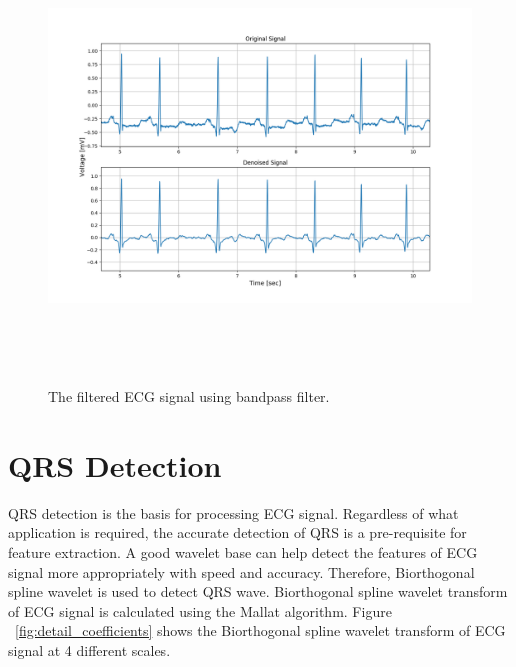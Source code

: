 \begin{figure}[h]
	\centering
	\includegraphics[width=15cm,height=12cm,keepaspectratio=true]{images/bandpass_denoised_1}
	\caption{
		The filtered ECG signal using bandpass filter.
	}
	\label{fig:bandpass_denoised}
\end{figure}


\section{QRS Detection}
QRS detection is the basis for processing ECG signal. Regardless of what application is required, the accurate detection of QRS is a pre-requisite for feature extraction. A good wavelet base can help detect the features of ECG signal more appropriately with speed and accuracy. Therefore, Biorthogonal spline wavelet is used to detect QRS wave. Biorthogonal spline wavelet transform of ECG signal is calculated using the Mallat algorithm. Figure ~\ref{fig:detail_coefficients} shows the Biorthogonal spline wavelet transform of ECG signal at 4 different scales.

